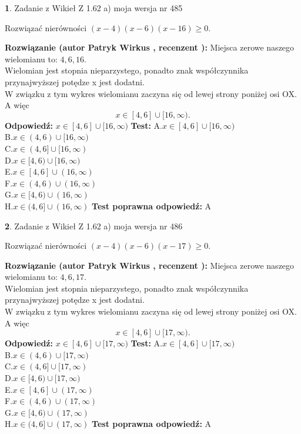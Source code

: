 \documentclass[12pt, a4paper]{article}
\theoremstyle{definition} %
\newtheorem{zad}{}
\newcommand{\zadStart}[1]{\begin{zad}#1\newline}
\newcommand{\zadStop}{\end{zad}}
\newcommand{\rozwStart}[2]{\noindent \textbf{Rozwiązanie (autor #1 , recenzent #2): }\newline}
\newcommand{\rozwStop}{\newline}
\newcommand{\odpStart}{\noindent \textbf{Odpowiedź:}\newline}
\newcommand{\odpStop}{\newline}
\newcommand{\testStart}{\noindent \textbf{Test:}\newline}
\newcommand{\testStop}{\newline}
\newcommand{\kluczStart}{\noindent \textbf{Test poprawna odpowiedź:}\newline}
\newcommand{\kluczStop}{\newline}
\begin{document}
\zadStart{Zadanie z Wikieł Z 1.62 a) moja wersja nr 485}

Rozwiązać nierówności $(x-4)(x-6)(x-16)\ge0$.
\zadStop
\rozwStart{Patryk Wirkus}{}
Miejsca zerowe naszego wielomianu to: $4, 6, 16$.\\
Wielomian jest stopnia nieparzystego, ponadto znak współczynnika przy\linebreak najwyższej potędze x jest dodatni.\\ W związku z tym wykres wielomianu zaczyna się od lewej strony poniżej osi OX. A więc $$x \in [4,6] \cup [16,\infty).$$
\rozwStop
\odpStart
$x \in [4,6] \cup [16,\infty)$
\odpStop
\testStart
A.$x \in [4,6] \cup [16,\infty)$\\
B.$x \in (4,6) \cup [16,\infty)$\\
C.$x \in (4,6] \cup [16,\infty)$\\
D.$x \in [4,6) \cup [16,\infty)$\\
E.$x \in [4,6] \cup (16,\infty)$\\
F.$x \in (4,6) \cup (16,\infty)$\\
G.$x \in [4,6) \cup (16,\infty)$\\
H.$x \in (4,6] \cup (16,\infty)$
\testStop
\kluczStart
A
\kluczStop



\zadStart{Zadanie z Wikieł Z 1.62 a) moja wersja nr 486}

Rozwiązać nierówności $(x-4)(x-6)(x-17)\ge0$.
\zadStop
\rozwStart{Patryk Wirkus}{}
Miejsca zerowe naszego wielomianu to: $4, 6, 17$.\\
Wielomian jest stopnia nieparzystego, ponadto znak współczynnika przy\linebreak najwyższej potędze x jest dodatni.\\ W związku z tym wykres wielomianu zaczyna się od lewej strony poniżej osi OX. A więc $$x \in [4,6] \cup [17,\infty).$$
\rozwStop
\odpStart
$x \in [4,6] \cup [17,\infty)$
\odpStop
\testStart
A.$x \in [4,6] \cup [17,\infty)$\\
B.$x \in (4,6) \cup [17,\infty)$\\
C.$x \in (4,6] \cup [17,\infty)$\\
D.$x \in [4,6) \cup [17,\infty)$\\
E.$x \in [4,6] \cup (17,\infty)$\\
F.$x \in (4,6) \cup (17,\infty)$\\
G.$x \in [4,6) \cup (17,\infty)$\\
H.$x \in (4,6] \cup (17,\infty)$
\testStop
\kluczStart
A
\kluczStop
\end{document}
